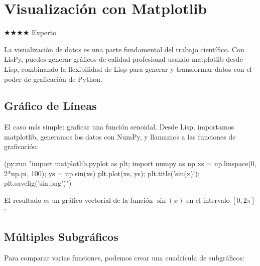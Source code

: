 \chapter{Visualización con Matplotlib}
\label{chap:visualization}
{\huge$\bigstar$}{\huge$\bigstar$}{\huge$\bigstar$}{\huge$\bigstar$} Experto

La visualización de datos es una parte fundamental del trabajo científico. Con
LisPy, puedes generar gráficos de calidad profesional usando matplotlib desde
Lisp, combinando la flexibilidad de Lisp para generar y transformar datos
con el poder de graficación de Python.

\section{Gráfico de Líneas}

El caso más simple: graficar una función senoidal. Desde Lisp, importamos
matplotlib, generamos los datos con NumPy, y llamamos a las funciones de
graficación:

\begin{lispcode}
(py:run "import matplotlib.pyplot as plt; import numpy as np
xs = np.linspace(0, 2*np.pi, 100); ys = np.sin(xs)
plt.plot(xs, ys); plt.title('sin(x)'); plt.savefig('sin.png')")
\end{lispcode}

El resultado es un gráfico vectorial de la función $\sin(x)$ en el intervalo
$[0, 2\pi]$:

\begin{center}
\end{center}

\section{Múltiples Subgráficos}

Para comparar varias funciones, podemos crear una cuadrícula de subgráficos:

